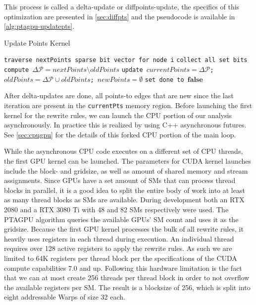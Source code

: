 This process is called a delta-update or diffpoints-update, the specifics of this optimization are presented in \autoref{sec:diffpts} and the pseudocode is available in \autoref{alg:ptagpu-updatepts}.
\begin{algorithm}
    \caption{Update Points Kernel}\label{alg:ptagpu-updatepts}
    \begin{algorithmic}
        \State \texttt{traverse nextPoints sparse bit vector for node i}
        \State \texttt{collect all set bits}
        \State \texttt{compute $\Delta \mathcal{P} = nextPoints\setminus oldPoints$} 
        \State \texttt{update $currentPoints = \Delta \mathcal{P}$; $oldPoints = \Delta \mathcal{P} \cup oldPoints$; $newPoints = \emptyset$}
        \State \texttt{set done to $\mathbf{false}$}
        \EndIf
        \EndFor
    \end{algorithmic}
\end{algorithm}
After delta-updates are done, all points-to edges that are new since the last iteration are present in the \verb|currentPts| memory region.
Before launching the first kernel for the rewrite rules, we can launch the CPU portion of our analysis asynchronously.
In practice this is realized by using C++ asynchronous futures.
See \autoref{sec:cpugpu} for the details of this forked CPU portion of the main loop.

While the asynchronous CPU code executes on a different set of CPU threads, the first GPU kernel can be launched.
The parameters for CUDA kernel launches include the block- and gridsize, as well as amount of shared memory and stream assignments.
Since GPUs have a set amount of SMs that can process thread blocks in parallel, it is a good idea to split the entire body of work into at least as many thread blocks as SMs are available.
During development both an RTX 2080 and a RTX 3080 Ti with 48 and 82 SMs respectively were used. The PTAGPU algorithm queries the available GPUs' SM count and uses it as the gridsize.
Because the first GPU kernel processes the bulk of all rewrite rules, it heavily uses registers in each thread during execution. An individual thread requires over 128 active registers to apply the rewrite rules. As such we are limited to 64K registers per thread block per the specifications of the CUDA compute capabilities 7.0 and up. Following this hardware limitation is the fact that we can at most create 256 threads per thread block in order to not overflow the available registers per SM.
The result is a blocksize of 256, which is split into eight addressable Warps of size 32 each.

